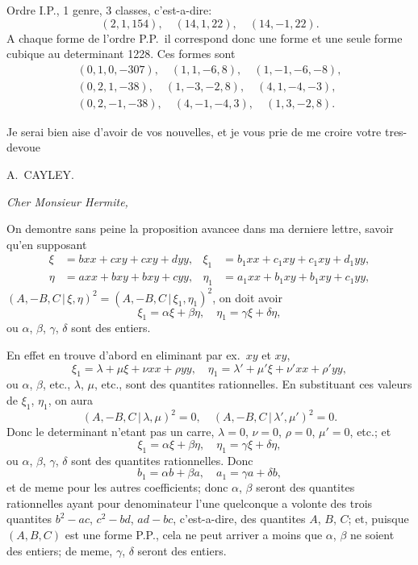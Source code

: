 \documentclass[11pt,a4paper]{book}
\begin{document}
Ordre I.P., 1 genre, 3 classes, c'est-a-dire:
\[
(2,1,154), \quad (14,1,22), \quad (14,-1,22).
\]
A chaque forme de l'ordre P.P.\ il correspond donc une forme et une seule forme cubique au determinant 1228. Ces formes sont
\begin{gather*}
(0,1,0,-307), \quad (1,1,-6,8), \quad (1,-1,-6,-8), \\
(0,2,1,-38), \quad (1,-3,-2,8), \quad (4,1,-4,-3), \\
(0,2,-1,-38), \quad (4,-1,-4,3), \quad (1,3,-2,8).
\end{gather*}

Je serai bien aise d'avoir de vos nouvelles, et je vous prie de me croire votre tres-devoue

\begin{flushright}
A.~CAYLEY.
\end{flushright}

\textit{Cher Monsieur Hermite,}

On demontre sans peine la proposition avancee dans ma derniere lettre, savoir qu'en supposant
\begin{align*}
\xi &= bxx + cxy + cxy + dyy, & \xi_1 &= b_1 xx + c_1 xy + c_1 xy + d_1 yy, \\
\eta &= axx + bxy + bxy + cyy, & \eta_1 &= a_1 xx + b_1 xy + b_1 xy + c_1 yy,
\end{align*}
$(A,-B,C \,|\, \xi,\eta)^2 = (A,-B,C \,|\, \xi_1,\eta_1)^2$, on doit avoir
\[
\xi_1 = \alpha\xi + \beta\eta, \quad \eta_1 = \gamma\xi + \delta\eta,
\]
ou $\alpha$, $\beta$, $\gamma$, $\delta$ sont des entiers.

En effet en trouve d'abord en eliminant par ex.\ $xy$ et $xy$,
\[
\xi_1 = \lambda + \mu\xi + \nu xx + \rho yy, \quad \eta_1 = \lambda' + \mu'\xi + \nu'xx + \rho'yy,
\]
ou $\alpha$, $\beta$, etc., $\lambda$, $\mu$, etc., sont des quantites rationnelles. En substituant ces valeurs de $\xi_1$, $\eta_1$, on aura
\[
(A,-B,C \,|\, \lambda,\mu)^2 = 0, \quad (A,-B,C \,|\, \lambda',\mu')^2 = 0.
\]
Donc le determinant n'etant pas un carre, $\lambda=0$, $\nu=0$, $\rho=0$, $\mu'=0$, etc.; et
\[
\xi_1 = \alpha\xi + \beta\eta, \quad \eta_1 = \gamma\xi + \delta\eta,
\]
ou $\alpha$, $\beta$, $\gamma$, $\delta$ sont des quantites rationnelles. Donc
\[
b_1 = \alpha b + \beta a, \quad a_1 = \gamma a + \delta b,
\]
et de meme pour les autres coefficients; donc $\alpha$, $\beta$ seront des quantites rationnelles ayant pour denominateur l'une quelconque a volonte des trois quantites $b^2-ac$, $c^2-bd$, $ad-bc$, c'est-a-dire, des quantites $A$, $B$, $C$; et, puisque $(A,B,C)$ est une forme P.P., cela ne peut arriver a moins que $\alpha$, $\beta$ ne soient des entiers; de meme, $\gamma$, $\delta$ seront des entiers.
\end{document}
